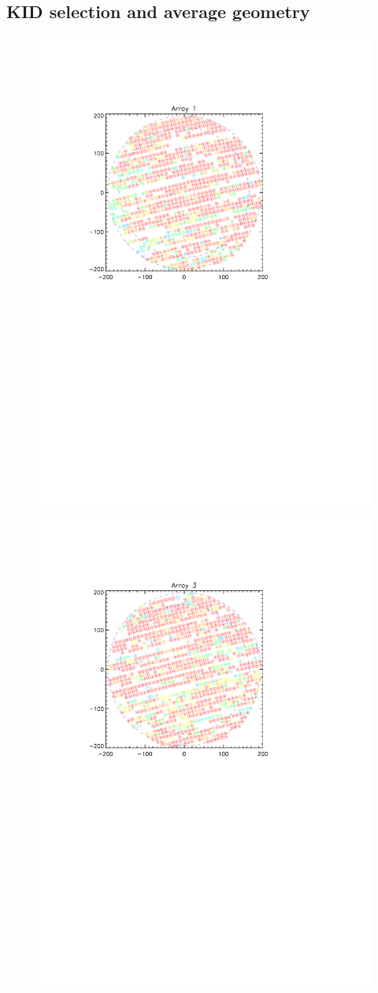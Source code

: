 

\subsection{KID selection and average geometry}
\label{avg_kidpar}

\begin{figure}[!tp]
\begin{center}
\includegraphics[trim=2cm 14cm 4cm 4cm, clip=true,width=0.45\linewidth]{Figures/A1_fwhm_color_count.pdf}
\includegraphics[trim=2cm 14cm 4cm 4cm, clip=true,width=0.45\linewidth]{Figures/A3_fwhm_color_count.pdf}

\end{center}
\end{figure}
